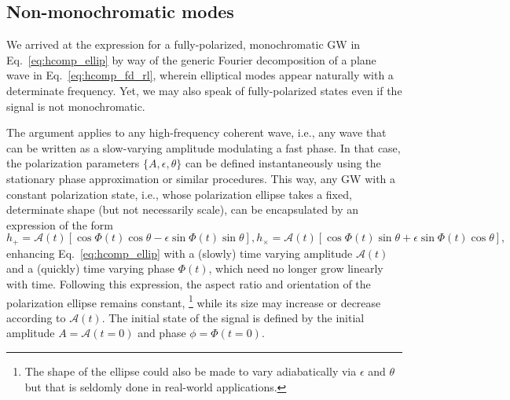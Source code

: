 \documentclass[aps,prd,twocolumn,superscriptaddress,preprintnumbers,floatfix,nofootinbib]{revtex4-2}
\newcommand*{\eq}[1]{Eq.~\eqref{eq:#1}}
\begin{document}

\subsection{Non-monochromatic modes}


We arrived at the expression for a fully-polarized, monochromatic GW in Eq.~\eqref{eq:hcomp_ellip} by way of the generic Fourier decomposition of a plane wave in Eq.~\eqref{eq:hcomp_fd_rl}, wherein elliptical modes appear naturally with a determinate frequency.
Yet, we may also speak of fully-polarized states even if the signal is not monochromatic.

The argument applies to any high-frequency coherent wave, i.e., any wave that can be written as a slow-varying amplitude modulating a fast phase.
In that case, the polarization parameters $\{A, \epsilon, \theta\}$ can be defined instantaneously using the stationary phase approximation or similar procedures.
This way, any GW with a constant polarization state, i.e., whose polarization ellipse takes a fixed, determinate shape (but not necessarily scale), can be encapsulated by an expression of the form
\begin{subequations} \label{eq:ellip_gen}
\begin{equation} %
h_+ = \mathcal{A}(t) \left[\cos \Phi(t) \cos \theta - \epsilon \sin \Phi(t) \sin\theta \right] ,
\end{equation}
\begin{equation} %
h_\times = \mathcal{A}(t) \left[ \cos \Phi(t) \sin \theta + \epsilon \sin \Phi(t) \cos\theta \right] ,
\end{equation}
\end{subequations}
enhancing Eq.~\eqref{eq:hcomp_ellip} with a (slowly) time varying amplitude $\mathcal{A}(t)$ and a (quickly) time varying phase $\Phi(t)$, which need no longer grow linearly with time.
Following this expression, the aspect ratio and orientation of the polarization ellipse remains constant,%
\footnote{The shape of the ellipse could also be made to vary adiabatically via $\epsilon$ and $\theta$ but that is seldomly done in real-world applications.}
while its size may increase or decrease according to $\mathcal{A}(t)$.
The initial state of the signal is defined by the initial amplitude $A = \mathcal{A}(t=0)$ and phase $\phi = \Phi(t=0)$.
\end{document}
